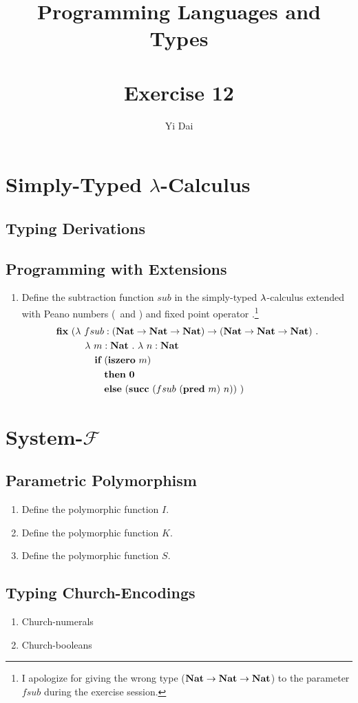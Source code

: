 \documentclass[a4paper,12pt]{article}
\title{
 Programming Languages and Types \\~\\
 \textbf{Exercise 12}
}
\author{
 Yi Dai
}
\begin{document}
\maketitle

\section{Simply-Typed $\lambda$-Calculus}

\subsection{Typing Derivations}

\subsection{Programming with Extensions}

\begin{enumerate}
 \item Define the subtraction function $sub$ in the simply-typed $\lambda$-calculus extended with Peano numbers
  (\zero\ and \succ) and fixed point operator \fixp.\footnote{I apologize for giving the wrong type ($\textbf{Nat}
  \rightarrow \textbf{Nat} \rightarrow \textbf{Nat}$) to the parameter $fsub$ during the exercise session.}
  \begin{align*}
   \fixp\ (& \lamb\ fsub : (\NatT \rarr \NatT \rarr \NatT) \rarr (\NatT \rarr \NatT \rarr \NatT)\ . \\
           & \quad \lamb\ m : \NatT\ .\ \lamb\ n : \NatT \\
           & \quad \quad \ifkw\ (\isze\ m) \\
           & \quad \quad \quad \thkw\ \zero \\
           & \quad \quad \quad \elkw\ (\succ\ (fsub\ (\pred\ m)\ n))\ )
  \end{align*}
\end{enumerate}

\section{System-$\mathcal{F}$}

\subsection{Parametric Polymorphism}

\begin{enumerate}
 \item Define the polymorphic function $I$.
 \item Define the polymorphic function $K$.
 \item Define the polymorphic function $S$.
\end{enumerate}

\subsection{Typing Church-Encodings}

\begin{enumerate}
 \item Church-numerals
 \item Church-booleans
\end{enumerate}
\end{document}
